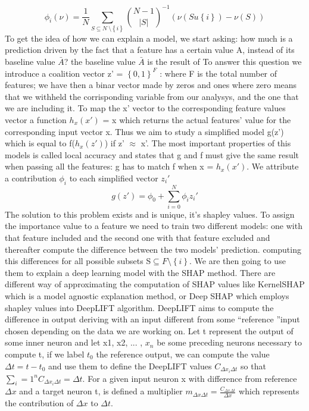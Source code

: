 \documentclass[a4paper,11pt]{article}
\begin{document}
\begin{equation}
\phi_i(\nu) = \frac{1}{N} \sum_{S\subseteq N\ \setminus \left \{ i \right \} }  {N- 1 \choose \left |S \right |}^{-1} \left ( \nu (S u \left\{ i \right\}) - \nu(S)\right)
\end{equation}
To get the idea of how we can explain a model, we start asking: how much is a prediction driven by the fact that a feature has a certain value A, instead of its baseline value $\bar A$? the baseline value $\bar A$ is the result of
To answer this question we introduce a coalition vector z' = $\left\{ 0, 1 \right\}^F$ : where F is the total number of features; we have then a binar vector made by zeros and ones where zero means that we withheld the corrisponding variable from our analysys, and the one that we are including it.
To map the x' vector to the corresponding feature values vector a function $h_x(x')$ = x which returns the actual features' value for the corresponding input vector x. Thus we aim to study a simplified model g(z') which is equal to f($h_x(z')$) if z' $\approx$ x'. The most important properties of this models is called local accuracy and states that g and f must give the same result when passing all the features: g has to match f when x = $h_x(x')$.
We attribute a contribution $\phi_i$ to each simplified vector $z_i'$
\begin{equation}
g(z') = \phi_0 + \sum_{i = 0}^N \phi_i z_i'
\end{equation}
The solution to this problem exists and is unique, it's shapley values.
To assign the importance value to a feature we need to train two different models: one with that feature included and the second one with that feature excluded and thereafter compute the difference between the two models' prediction. computing this differences for all possible subsets S$\subseteq F \setminus \left\{i\right\}$.
We are then going to use them to explain a deep learning model with the SHAP method. There are different way of approximating the computation of SHAP values like KernelSHAP which is a model agnostic explanation method, or Deep SHAP which employs shapley values into DeepLIFT algorithm.
DeepLIFT aims to compute the difference in output deriving with an input different from some \textquotedblleft reference \textquotedblright input chosen depending on the data we are working on.
Let t represent the output of some inner neuron and let x1, x2, ... , $x_n$ be some preceding neurons necessary to compute t, if we label $t_0$ the reference output, we can compute the value $\Delta t = t-t_0$ and use them to define the DeepLIFT values $C_{\Delta x_i \Delta t}$ so that $\sum_i = 1 ^n C_{\Delta x_i \Delta t} = \Delta t$. For a given input neuron x with difference from reference $\Delta x$ and a target neuron t, is defined a multiplier $m_{\Delta x \Delta t} = \frac{C_{\Delta x \Delta t}}{\Delta x}$ which represents the contribution of $\Delta x$ to $\Delta t$.
\end{document}
